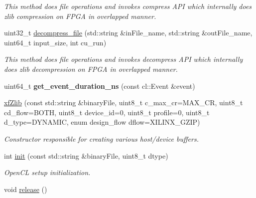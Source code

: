 \begin{DoxyCompactItemize}
\begin{DoxyCompactList}\small\item\em This method does file operations and invokes compress A\-P\-I which internally does zlib compression on F\-P\-G\-A in overlapped manner. \end{DoxyCompactList}\item 
uint32\-\_\-t \hyperlink{classxf_1_1compression_1_1xfZlib_a847206ba337f6811dbd477c1533586c3}{decompress\-\_\-file} (std\-::string \&in\-File\-\_\-name, std\-::string \&out\-File\-\_\-name, uint64\-\_\-t input\-\_\-size, int cu\-\_\-run)
\begin{DoxyCompactList}\small\item\em This method does file operations and invokes decompress A\-P\-I which internally does zlib decompression on F\-P\-G\-A in overlapped manner. \end{DoxyCompactList}\item 
\hypertarget{classxf_1_1compression_1_1xfZlib_aa2477f22a23fc8ce1ffa8c968c588f29}{uint64\-\_\-t {\bfseries get\-\_\-event\-\_\-duration\-\_\-ns} (const cl\-::\-Event \&event)}\label{classxf_1_1compression_1_1xfZlib_aa2477f22a23fc8ce1ffa8c968c588f29}

\item 
\hypertarget{classxf_1_1compression_1_1xfZlib_a7712b200970e31a07526a43b40661dfe}{\hyperlink{classxf_1_1compression_1_1xfZlib_a7712b200970e31a07526a43b40661dfe}{xf\-Zlib} (const std\-::string \&binary\-File, uint8\-\_\-t c\-\_\-max\-\_\-cr=M\-A\-X\-\_\-\-C\-R, uint8\-\_\-t cd\-\_\-flow=B\-O\-T\-H, uint8\-\_\-t device\-\_\-id=0, uint8\-\_\-t profile=0, uint8\-\_\-t d\-\_\-type=D\-Y\-N\-A\-M\-I\-C, enum design\-\_\-flow dflow=X\-I\-L\-I\-N\-X\-\_\-\-G\-Z\-I\-P)}\label{classxf_1_1compression_1_1xfZlib_a7712b200970e31a07526a43b40661dfe}

\begin{DoxyCompactList}\small\item\em Constructor responsible for creating various host/device buffers. \end{DoxyCompactList}\item 
int \hyperlink{classxf_1_1compression_1_1xfZlib_a87f13a66b1928934295c46677666fabe}{init} (const std\-::string \&binary\-File, uint8\-\_\-t dtype)
\begin{DoxyCompactList}\small\item\em Open\-C\-L setup initialization. \end{DoxyCompactList}\item 
\hypertarget{classxf_1_1compression_1_1xfZlib_a161a134c573011f422026e83597b96b3}{void \hyperlink{classxf_1_1compression_1_1xfZlib_a161a134c573011f422026e83597b96b3}{release} ()}\label{classxf_1_1compression_1_1xfZlib_a161a134c573011f422026e83597b96b3}


\end{DoxyCompactItemize}
